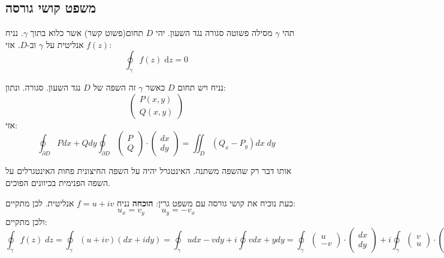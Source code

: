 \documentclass{tstextbook}
\begin{document}
\subsection{משפט קושי גורסה}

\begin{theorem}
תהי \(\gamma\) מסילה פשוטה סגורה נגד השעון. יהי \(D\) תחום(פשוט קשר) אשר כלוא בתוך \(\gamma\). נניח \(f(z)\) אנליטית על \(\gamma\) וב-\(D\). אזי:
$$\oint_{\gamma}f(z)\;\mathrm{d}z=0$$

\end{theorem}
\begin{theorem}[גרין]
נניח ויש תחום \(D\) כאשר \(\gamma\) זה השפה של \(D\) נגד השעון. סגורה. ונתון:
$$\begin{pmatrix}P(x,y) \\Q(x,y) 
\end{pmatrix}$$
אזי:
$$\oint_{\partial D} Pdx+Qdy\oint_{\partial D}\begin{pmatrix}P\\Q\end{pmatrix} \cdot \begin{pmatrix}dx\\ dy
\end{pmatrix} = \iint_{D} (Q_{x}-P_{y})dx\;dy$$

\end{theorem}
\begin{theorem}
אותו דבר רק שהשפה משתנה. האינטגרל יהיה על השפה החיצונית פחות האינטגרלים על השפה הפנימית בכיוונים הפוכים.

\end{theorem}
כעת נוכיח את קושי גורסה עם משפט גרין:
\textbf{הוכחה}
נניח \(f=u+iv\) אנליטית. לכן מתקיים:
$$u_{x}=v_{y}\qquad u_{y}=-v_{x}$$
ולכן מתקיים:
$$\oint_{\gamma} f(z)\;dz=\oint_{\gamma }(u+iv)(dx+idy)=\oint_{\gamma}udx-vdy+i\oint vdx+ydy = \oint_{\gamma} \begin{pmatrix}u\\ -v \end{pmatrix}\cdot \begin{pmatrix}dx \\ dy\end{pmatrix}+i\oint_{\gamma}\begin{pmatrix}v \\ u\end{pmatrix}\cdot \begin{pmatrix}dx \\ dy
\end{pmatrix}$$
\end{document}
